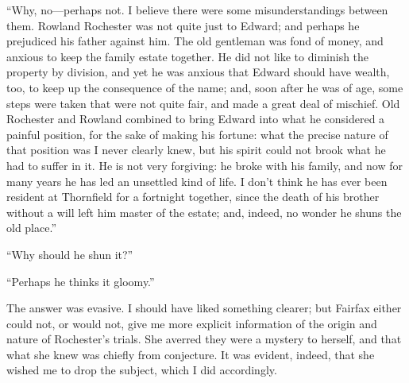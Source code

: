 \enquote{Why, no---perhaps not. I believe there were some
misunderstandings between them. \Mr{} Rowland Rochester was not quite
just to \Mr{} Edward; and perhaps he prejudiced his father against him. 
The old gentleman was fond of money, and anxious to keep the family
estate together. He did not like to diminish the property by division,
and yet he was anxious that \Mr{} Edward should have wealth, too, to keep
up the consequence of the name; and, soon after he was of age, some
steps were taken that were not quite fair, and made a great deal of
mischief. Old \Mr{} Rochester and \Mr{} Rowland combined to bring \Mr{}
Edward into what he considered a painful position, for the sake of
making his fortune: what the precise nature of that position was I never
clearly knew, but his spirit could not brook what he had to suffer in
it. He is not very forgiving: he broke with his family, and now for
many years he has led an unsettled kind of life. I don't think he has
ever been resident at Thornfield for a fortnight together, since the
death of his brother without a will left him master of the estate; and,
indeed, no wonder he shuns the old place.}

\enquote{Why should he shun it?}

\enquote{Perhaps he thinks it gloomy.}

The answer was evasive. I should have liked something clearer; but \Mrs{}
Fairfax either could not, or would not, give me more explicit
information of the origin and nature of \Mr{} Rochester's trials. She
averred they were a mystery to herself, and that what she knew was
chiefly from conjecture. It was evident, indeed, that she wished me to
drop the subject, which I did accordingly.
